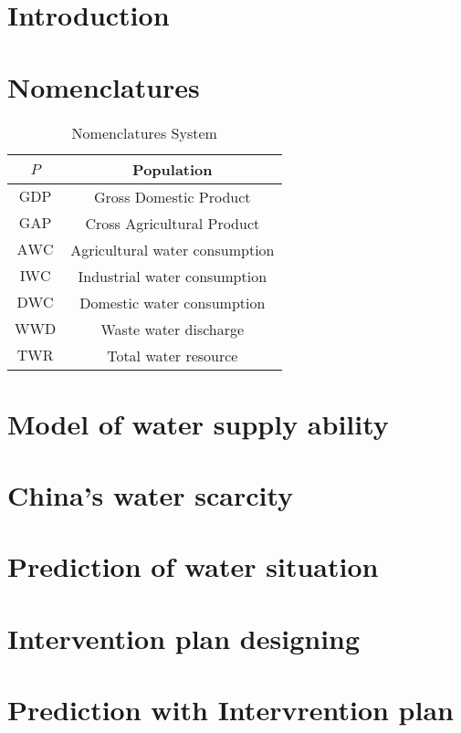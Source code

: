 
\section{Introduction}

\section{Nomenclatures}

\begin{table}[tb]
  \caption{Nomenclatures System}
  \centering
  \begin{tabular}{||c|c||}
    \hline
    $P$   & Population \\
    \hline
    $\text{GDP}$ & Gross Domestic Product \\
    \hline
    $\text{GAP}$ & Cross Agricultural Product \\
    \hline
    $\text{AWC}$ & Agricultural water consumption \\
    \hline
    $\text{IWC}$ & Industrial water consumption \\
    \hline
    $\text{DWC}$ & Domestic water consumption \\
    \hline
    $\text{WWD}$ & Waste water discharge \\
    \hline
    $\text{TWR}$ & Total water resource \\
    \hline
  \end{tabular}
\end{table}

\section{Model of water supply ability}

\section{China's water scarcity}

\section{Prediction of water situation}

\section{Intervention plan designing}

\section{Prediction with Intervrention plan}

